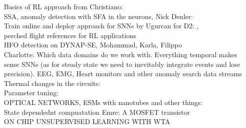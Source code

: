 Basics of RL approach from Christiano: \\
SSA, anomaly detection with SFA in the neurons, Nick Denler: \cite{Dennler_etal21a}\\
Train online and deploy approach for SNNs by Ugurcan for D2: \cite{Cakal_etal24}, \\
perched flight references for RL applications \\
HFO detection on DYNAP-SE, Mohammad, Karla, Filippo~\cite{Sharifshazileh_etal21}\\
Charlotte: Which data domains do we work with. Everything temporal makes sense SNNs (as for steady state we need to inevitably integrate events and lose precision). EEG, EMG, Heart monitors and other anomaly search data streams \\
Thermal changes in the circuits: \cite{}\\
Parameter tuning: \cite{Neftci_Indiveri10, Gao_etal12}\\
OPTICAL NETWORKS, ESMs with nanotubes and other things: \\
State dependednt compuatation Emre: \cite{Neftci_etal10}
A \ac{MOSFET} transistor~\cite{Colinge2002}\\

ON CHIP UNSUPERVISED LEARNING WITH WTA  \cite{Kreiser_etal18a}


